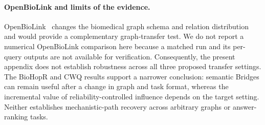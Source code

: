 \documentclass{article} %
\begin{document}
\paragraph{OpenBioLink and limits of the evidence.}
OpenBioLink~\citep{breit2020openbiolink} changes the biomedical graph schema and relation distribution and would provide a complementary graph-transfer test. We do not report a numerical OpenBioLink comparison here because a matched run and its per-query outputs are not available for verification. Consequently, the present appendix does not establish robustness across all three proposed transfer settings. The BioHopR and CWQ results support a narrower conclusion: semantic Bridges can remain useful after a change in graph and task format, whereas the incremental value of reliability-controlled influence depends on the target setting. Neither establishes mechanistic-path recovery across arbitrary graphs or answer-ranking tasks.
\normalsize

\begingroup
\makeatletter
\setlength{\@fptop}{0pt}
\makeatother
\clearpage
\endgroup
\end{document}
